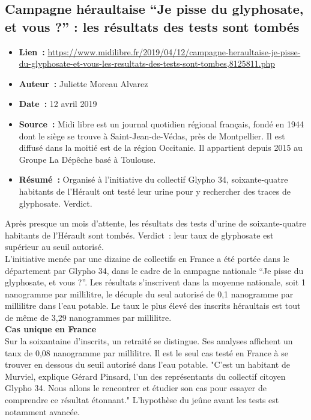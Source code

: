 \documentclass[8pt]{article}
\begin{document}
\newpage
\subsection{Campagne héraultaise “Je pisse du glyphosate, et vous ?” : les résultats des tests sont tombés}
\label{sec:pisse}

\begin{itemize}
	\item \textbf{Lien~: }  \url{https://www.midilibre.fr/2019/04/12/campagne-heraultaise-je-pisse-du-glyphosate-et-vous-les-resultats-des-tests-sont-tombes,8125811.php} 
	\item \textbf{Auteur~: } Juliette Moreau Alvarez
	\item \textbf{Date~: } 12 avril 2019
	\item \textbf{Source~: } Midi libre est un journal quotidien régional français, fondé en 1944 dont le siège se trouve à Saint-Jean-de-Védas, près de Montpellier. Il est diffusé dans la moitié est de la région Occitanie. Il appartient depuis 2015 au Groupe La Dépêche basé à Toulouse. 
	\item \textbf{Résumé~: } Organisé à l’initiative du collectif Glypho 34, soixante-quatre habitants de l’Hérault ont testé leur urine pour y rechercher des traces de glyphosate. Verdict.
\end{itemize}

Après presque un mois d’attente, les résultats des tests d’urine de soixante-quatre habitants de l’Hérault sont tombés. Verdict~: leur taux de glyphosate est supérieur au seuil autorisé.\\

L’initiative menée par une dizaine de collectifs en France a été portée dans le département par Glypho 34, dans le cadre de la campagne nationale “Je pisse du glyphosate, et vous ?”. Les résultats s’inscrivent dans la moyenne nationale, soit 1 nanogramme par millilitre, le décuple du seul autorisé de 0,1 nanogramme par millilitre dans l’eau potable. Le taux le plus élevé des inscrits héraultais est tout de même de 3,29 nanogrammes par millilitre.\\

\textbf{Cas unique en France}\\

Sur la soixantaine d’inscrits, un retraité se distingue. Ses analyses affichent un taux de 0,08 nanogramme par millilitre. Il est le seul cas testé en France à se trouver en dessous du seuil autorisé dans l’eau potable. "C’est un habitant de Murviel, explique Gérard Pinsard, l’un des représentants du collectif citoyen Glypho 34. Nous allons le rencontrer et étudier son cas pour essayer de comprendre ce résultat étonnant." L’hypothèse du jeûne avant les tests est notamment avancée.\\
\end{document}

